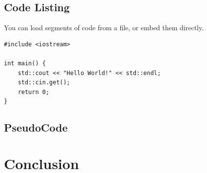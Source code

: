 \documentclass[10pt, a4paper]{article}
\begin{document}
	\subsection{Code Listing}
    You can load segments of code from a file, or embed them directly.
    
\begin{lstlisting}[caption = Hello World! in c++]
#include <iostream>

int main() {
    std::cout << "Hello World!" << std::endl;
    std::cin.get();
    return 0;
}
\end{lstlisting}
    
\subsection{PseudoCode}

\begin{algorithm}[h]
\caption{FizzBuzz}
\end{algorithm}
	
\section{Conclusion}	


		
\end{document}
